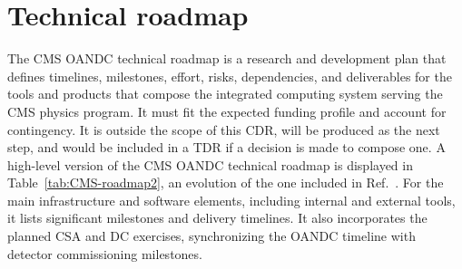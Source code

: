 \clearpage
%
%
% 
\section{Technical roadmap}
\label{sec:Roadmap}

The CMS \gls{OANDC} technical roadmap is a research and development plan that defines timelines, milestones, effort, risks, dependencies, and deliverables for the tools and products that compose the integrated computing system serving the CMS \PhaseTwo physics program. It must fit the expected funding profile and account for contingency. It is outside the scope of this \gls{CDR}, will be produced as the next step, and would be included in a \gls{TDR} if a decision is made to compose one. A high-level version of the CMS \gls{OANDC} \PhaseTwo technical roadmap is displayed in Table~\ref{tab:CMS-roadmap2}, an evolution of the one included in Ref.~\cite{Software:2815292}. For the main infrastructure and software elements, including internal and external tools, it lists significant milestones and delivery timelines. It also incorporates the planned \gls{CSA} and \gls{DC} exercises, synchronizing the \gls{OANDC} timeline with detector commissioning milestones.

